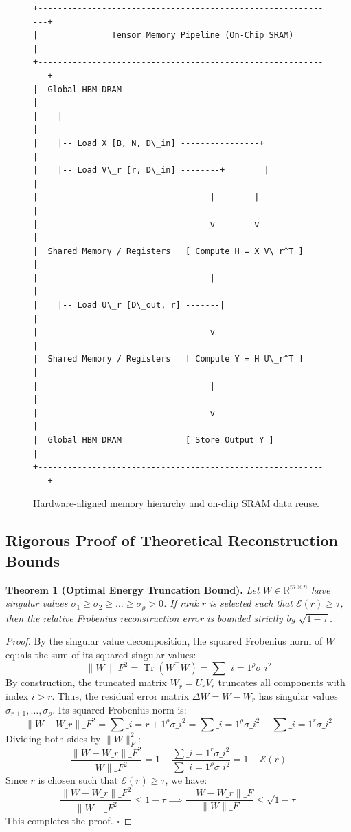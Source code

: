 \begin{figure}[H]
\centering
\begin{verbatim}
+-------------------------------------------------------------+
|               Tensor Memory Pipeline (On-Chip SRAM)         |
+-------------------------------------------------------------+
|  Global HBM DRAM                                            |
|    |                                                        |
|    |-- Load X [B, N, D\_in] ----------------+                |
|    |-- Load V\_r [r, D\_in] --------+        |                |
|                                   |        |                |
|                                   v        v                |
|  Shared Memory / Registers   [ Compute H = X V\_r^T ]        |
|                                   |                         |
|    |-- Load U\_r [D\_out, r] -------|                         |
|                                   v                         |
|  Shared Memory / Registers   [ Compute Y = H U\_r^T ]        |
|                                   |                         |
|                                   v                         |
|  Global HBM DRAM             [ Store Output Y ]             |
+-------------------------------------------------------------+
\end{verbatim}
\caption{Hardware-aligned memory hierarchy and on-chip SRAM data reuse.}
\label{fig:memory_hierarchy}
\end{figure}

\subsection{Rigorous Proof of Theoretical Reconstruction Bounds}

\textbf{Theorem 1 (Optimal Energy Truncation Bound).} \textit{Let $W \in \mathbb{R}^{m \times n}$ have singular values $\sigma_1 \ge \sigma_2 \ge \dots \ge \sigma_{\rho} > 0$. If rank $r$ is selected such that $\mathcal{E}(r) \ge \tau$, then the relative Frobenius reconstruction error is bounded strictly by $\sqrt{1 - \tau}$.}

\begin{proof}
By the singular value decomposition, the squared Frobenius norm of $W$ equals the sum of its squared singular values:
\[
\|W\|\_F^2 = \operatorname{Tr}(W^\top W) = \sum\_{i=1}^{\rho} \sigma\_i^2
\]
By construction, the truncated matrix $W_r = U_r V_r$ truncates all components with index $i > r$. Thus, the residual error matrix $\Delta W = W - W_r$ has singular values $\sigma_{r+1}, \dots, \sigma_{\rho}$.
Its squared Frobenius norm is:
\[
\|W - W\_r\|\_F^2 = \sum\_{i=r+1}^{\rho} \sigma\_i^2 = \sum\_{i=1}^{\rho} \sigma\_i^2 - \sum\_{i=1}^{r} \sigma\_i^2
\]
Dividing both sides by $\|W\|_F^2$:
\[
\frac{\|W - W\_r\|\_F^2}{\|W\|\_F^2} = 1 - \frac{\sum\_{i=1}^{r} \sigma\_i^2}{\sum\_{i=1}^{\rho} \sigma\_i^2} = 1 - \mathcal{E}(r)
\]
Since $r$ is chosen such that $\mathcal{E}(r) \ge \tau$, we have:
\[
\frac{\|W - W\_r\|\_F^2}{\|W\|\_F^2} \le 1 - \tau \implies \frac{\|W - W\_r\|\_F}{\|W\|\_F} \le \sqrt{1 - \tau}
\]
This completes the proof. $\square$
\end{proof}

